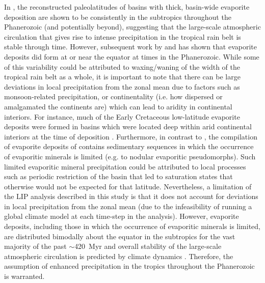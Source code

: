 \documentclass[11pt,letterpaper]{article}
\begin{document}
In \citet{Evans2006a}, the reconstructed paleolatitudes of basins with thick, basin-wide evaporite deposition are shown to be consistently in the subtropics throughout the Phanerozoic (and potentially beyond), suggesting that the large-scale atmospheric circulation that gives rise to intense precipitation in the tropical rain belt is stable through time. However, subsequent work by \citet{Boucot2013a} and \citet{Cao2018a} has shown that evaporite deposits did form at or near the equator at times in the Phanerozoic. While some of this variability could be attributed to waxing/waning of the width of the tropical rain belt as a whole, it is important to note that there can be large deviations in local precipitation from the zonal mean due to factors such as monsoon-related precipitation, or continentality (i.e. how dispersed or amalgamated the continents are) which can lead to aridity in continental interiors. For instance, much of the Early Cretaceous low-latitude evaporite deposits were formed in basins which were located deep within arid continental interiors at the time of deposition \citep{Boucot2013a, Cao2018a}. Furthermore, in contrast to \citet{Evans2006a}, the compilation of evaporite deposits of \citet{Boucot2013a} contains sedimentary sequences in which the occurrence of evaporitic minerals is limited (e.g. to nodular evaporitic pseudomorphs). Such limited evaporitic mineral precipitation could be attributed to local processes such as periodic restriction of the basin that led to saturation states that otherwise would not be expected for that latitude. Nevertheless, a limitation of the LIP analysis described in this study is that it does not account for deviations in local precipitation from the zonal mean (due to the infeasibility of running a global climate model at each time-step in the analysis). However, evaporite deposits, including those in which the occurrence of evaporitic minerals is limited, are distributed bimodally about the equator in the subtropics for the vast majority of the past $\sim$420~Myr \citep{Cao2018a} and overall stability of the large-scale atmospheric circulation is predicted by climate dynamics \citep{Donohoe2017a}. Therefore, the assumption of enhanced precipitation in the tropics throughout the Phanerozoic is warranted.
\end{document}
